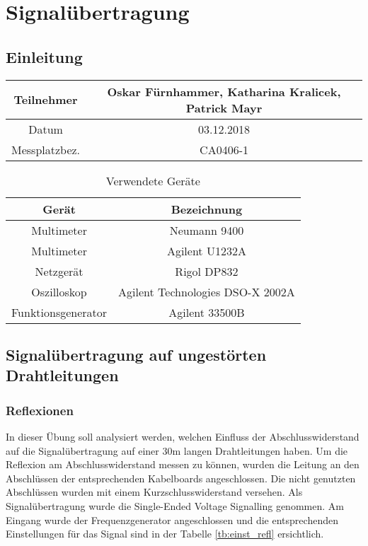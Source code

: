 \chapter{Signalübertragung}

\section{Einleitung}

\begin{table}[!h]
	\centering
	\begin{tabular}{|c|c|}
		\hline 
		Teilnehmer 		& Oskar Fürnhammer, Katharina Kralicek, Patrick Mayr \\
		\hline 
		Datum 		& 03.12.2018 \\ 
		\hline 
		Messplatzbez. 	& CA0406-1 \\
		\hline
	\end{tabular} 
\end{table}

\begin{table}[!h]
	\centering
	\begin{tabular}{ c | c }

Gerät				& Bezeichnung		\\
\hline

Multimeter			& Neumann 9400				\\
Multimeter			& Agilent U1232A				\\
Netzgerät			& Rigol DP832 				\\
Oszilloskop			& Agilent Technologies DSO-X 2002A 	\\
Funktionsgenerator		& Agilent 33500B 				\\

	\end{tabular}

	\caption{Verwendete Geräte}
\end{table}


\newpage

\section{Signalübertragung auf ungestörten Drahtleitungen}

\subsection{Reflexionen}

In dieser Übung soll analysiert werden, welchen Einfluss der Abschlusswiderstand auf die Signalübertragung auf einer 30m langen Drahtleitungen haben. Um die Reflexion am Abschlusswiderstand messen zu können, wurden die Leitung an den Abschlüssen der entsprechenden Kabelboards angeschlossen. Die nicht genutzten Abschlüssen wurden mit einem Kurzschlusswiderstand versehen. Als Signalübertragung wurde die Single-Ended Voltage Signalling genommen. Am Eingang wurde der Frequenzgenerator angeschlossen und die entsprechenden Einstellungen für das Signal sind in der Tabelle \ref{tb:einst_refl} ersichtlich. \\

